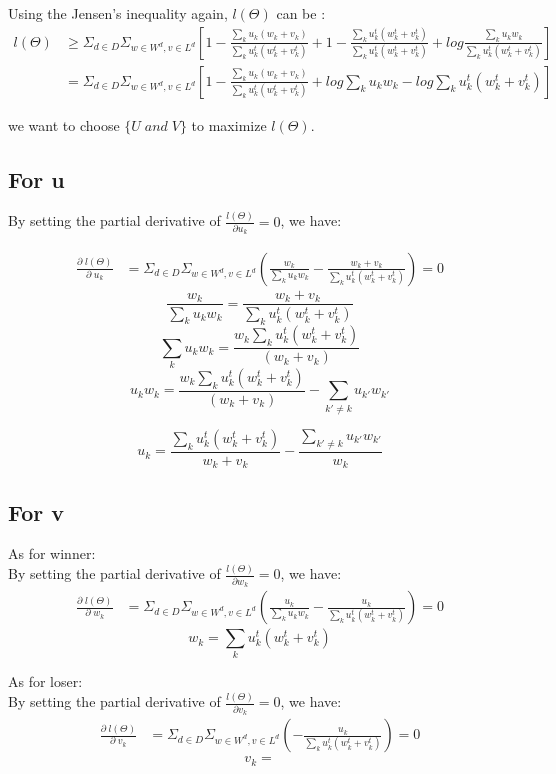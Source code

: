 \documentclass{article}
\begin{document}
Using the Jensen's inequality again, $l(\Theta)$ can be :
\begin{align}
l(\Theta)
& \geq \Sigma_{d \in D} \Sigma_{w\in W^d, v\in L^d} [1- \frac{\sum_k u_k(w_k+v_k)}{\sum_k u_k^t(w_k^t +v_k^t)}+ 1-\frac{\sum_k u_k^t(w_k^t +v_k^t)}{\sum_k u_k^t(w_k^t +v_k^t)} +log \frac{\sum_k u_k w_k}{\sum_k u_k^t (w_k^t+v_k^t)}]\\
& =\Sigma_{d \in D} \Sigma_{w\in W^d, v\in L^d} [1- \frac{\sum_k u_k(w_k+v_k)}{\sum_k u_k^t(w_k^t +v_k^t)}+ log \sum_k u_k w_k -log \sum_k u_k^t (w_k^t+v_k^t)]
\end{align}

 we want to choose $\{ U \; and \; V\}$ to maximize $ l(\Theta). $


\subsection{For u}
By setting the partial derivative of $\frac{l(\Theta)}{\partial u_k}=0$, we have:

\begin{align}
\frac{\partial \;l(\Theta) }{\partial \;u_k}
 &= \Sigma_{d \in D} \Sigma_{w\in W^d, v\in L^d}(\frac{w_k}{\sum_k u_k w_k}-\frac{w_k+v_k}{\sum_k u_k^t(w_k^t +v_k^t)}) =0
\end{align}
$$ \frac{w_k}{\sum_k u_k w_k}=\frac{w_k+v_k}{\sum_k u_k^t(w_k^t +v_k^t)}$$
$$ \sum_k u_k w_k =\frac{ w_k \sum_k u_k^t(w_k^t +v_k^t)}{(w_k+v_k)} $$
$$ u_k w_k  = \frac{ w_k \sum_k u_k^t(w_k^t +v_k^t)}{(w_k+v_k)} -\sum_{k' \neq k} u_{k'} w_{k'} $$

$$ u_k = \frac{\sum_k u_k^t(w_k^t +v_k^t)}{w_k+v_k} - \frac{\sum_{k' \neq k} u_{k'} w_{k'}}{w_k}$$

\subsection{For v}

As for winner:\\
By setting the partial derivative of $\frac{l(\Theta)}{\partial w_k}=0$, we have:
\begin{align}
\frac{\partial \;l(\Theta)}{\partial \;w_k}
&=  \Sigma_{d \in D} \Sigma_{w\in W^d, v\in L^d}(\frac{u_k}{\sum_k u_k w_k}-\frac{u_k}{\sum_k u_k^t(w_k^t +v_k^t)})=0
\end{align}
$$ w_k = \sum_k u_k^t(w_k^t +v_k^t) $$

As for loser:\\
By setting the partial derivative of $\frac{l(\Theta)}{\partial v_k}=0$, we have:
\begin{align}
\frac{\partial \;l(\Theta)}{\partial \;v_k}
&=  \Sigma_{d \in D} \Sigma_{w\in W^d, v\in L^d}(-\frac{u_k}{\sum_k u_k^t(w_k^t +v_k^t)})=0
\end{align}
$$ v_k =  $$
\end{document}

